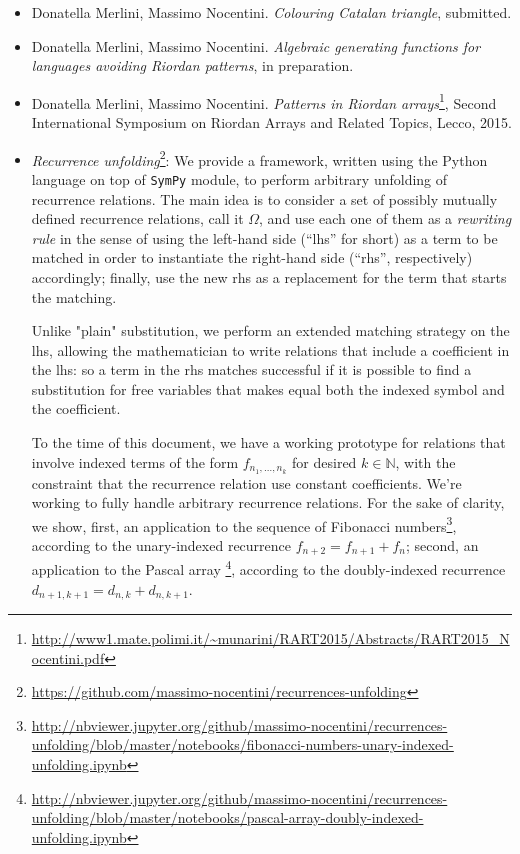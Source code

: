 \documentclass[10pt,a4paper]{scrartcl}
\begin{document}
    \begin{itemize}

        \item Donatella Merlini, Massimo Nocentini. \emph{Colouring Catalan triangle}, submitted.

        \item Donatella Merlini, Massimo Nocentini. \emph{Algebraic generating functions for languages
            avoiding Riordan patterns}, in preparation.

        \item Donatella Merlini, Massimo Nocentini. \emph{Patterns in Riordan arrays}\footnote{\url{http://www1.mate.polimi.it/~munarini/RART2015/Abstracts/RART2015_Nocentini.pdf}}, 
            Second International Symposium on Riordan Arrays and Related Topics, Lecco, 2015.

        \item \emph{Recurrence unfolding}\footnote{\url{https://github.com/massimo-nocentini/recurrences-unfolding}}: 
            We provide a framework, written using the Python language
            on top of \texttt{SymPy} module, to perform arbitrary unfolding of recurrence relations. The main idea
            is to consider a set of possibly mutually defined recurrence relations, call it $\Omega$, and use each
            one of them as a \emph{rewriting rule} in the sense of using the left-hand side (``lhs'' for short) 
            as a term to be matched in order to instantiate the right-hand side (``rhs'', respectively) accordingly; 
            finally, use the new rhs as a replacement for the term that starts the matching. 

            Unlike "plain" substitution, we perform an extended matching strategy on the lhs, 
            allowing the mathematician to write relations that include a coefficient in the lhs: so a term in the rhs
            matches successful if it is possible to find a substitution for free variables that makes equal both
            the indexed symbol and the coefficient.

            To the time of this document, we have a working prototype for relations that involve indexed terms of the
            form $f_{n_{1}, \ldots, n_{k}}$ for desired $k\in\mathbb{N}$, with the constraint that the recurrence relation 
            use constant coefficients. We're working to fully handle arbitrary recurrence relations. For the sake of 
            clarity, we show, first, an application to the sequence of Fibonacci numbers\footnote{\url{http://nbviewer.jupyter.org/github/massimo-nocentini/recurrences-unfolding/blob/master/notebooks/fibonacci-numbers-unary-indexed-unfolding.ipynb}},
            according to the unary-indexed recurrence $f_{n+2}=f_{n+1}+f_{n}$; second, an application to the Pascal array
            \footnote{\url{http://nbviewer.jupyter.org/github/massimo-nocentini/recurrences-unfolding/blob/master/notebooks/pascal-array-doubly-indexed-unfolding.ipynb}},
            according to the doubly-indexed recurrence $d_{n+1,k+1} = d_{n,k}+d_{n,k+1}$.


\end{itemize}
\end{document}

